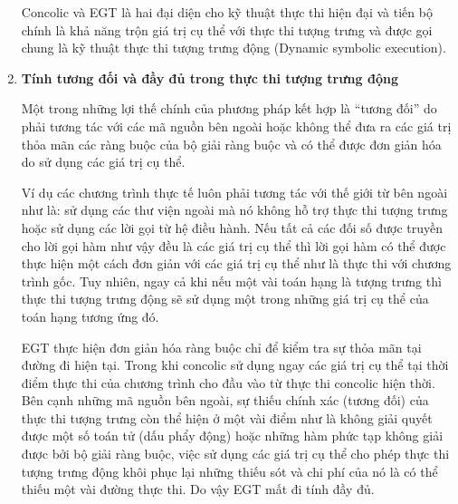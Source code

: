 \documentclass[12pt,a4paper]{report}
\begin{document}
\begin{enumerate}
Concolic và EGT là hai đại diện cho kỹ thuật thực thi hiện đại và tiến bộ chính là khả năng trộn giá trị cụ thể với thực thi tượng trưng và được gọi chung là kỹ thuật thực thi tượng trưng động (Dynamic symbolic execution).

\item \textbf{Tính tương đối và đầy đủ trong thực thi tượng trưng động}

Một trong những lợi thế chính của phương pháp kết hợp là “tương đối” do phải tương tác với các mã nguồn bên ngoài hoặc không thể đưa ra các giá trị thỏa mãn các ràng buộc của bộ giải ràng buộc và có thể được đơn giản hóa do sử dụng các giá trị cụ thể.

Ví dụ các chương trình thực tế luôn phải tương tác với thế giới từ bên ngoài như là: sử dụng các thư viện ngoài mà nó không hỗ trợ thực thi tượng trưng hoặc sử dụng các lời gọi từ hệ điều hành. Nếu tất cả các đối số được truyền cho lời gọi hàm như vậy đều là các giá trị cụ thể thì lời gọi hàm có thể được thực hiện một cách đơn giản với các giá trị cụ thể như là thực thi với chương trình gốc. Tuy nhiên, ngay cả khi nếu một vài toán hạng là tượng trưng thì thực thi tượng trưng động sẽ sử dụng một trong những giá trị cụ thể của toán hạng tương ứng đó.

EGT thực hiện đơn giản hóa ràng buộc chỉ để kiểm tra sự thỏa mãn tại đường đi hiện tại. Trong khi concolic sử dụng ngay các giá trị cụ thể tại thời điểm thực thi của chương trình cho đầu vào từ thực thi concolic hiện thời. Bên cạnh những mã nguồn bên ngoài, sự thiếu chính xác (tương đối) của thực thi tượng trưng còn thể hiện ở một vài điểm như là không giải quyết được một số toán tử (dấu phẩy động) hoặc những hàm phức tạp không giải được bởi bộ giải ràng buộc, việc sử dụng các giá trị cụ thể cho phép thực thi tượng trưng động khôi phục lại những thiếu sót và chi phí của nó là có thể thiếu một vài đường thực thi. Do vậy EGT mất đi tính đầy đủ.


\end{enumerate}
\end{document}
